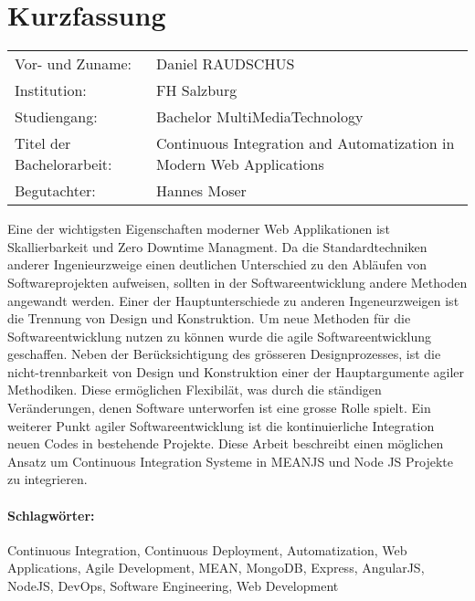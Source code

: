 \section*{Kurzfassung}
\begin{tabular}{l l}
Vor- und Zuname:& Daniel RAUDSCHUS\\
Institution: & FH Salzburg\\
Studiengang: &  Bachelor MultiMediaTechnology\\
Titel der Bachelorarbeit: & Continuous Integration and Automatization in Modern Web Applications\\
Begutachter: & Hannes Moser\\
\end{tabular}
\vspace{0.5cm}

Eine der wichtigsten Eigenschaften moderner Web Applikationen ist Skallierbarkeit und Zero Downtime Managment. Da die Standardtechniken anderer Ingenieurzweige
einen deutlichen Unterschied zu den Abläufen von Softwareprojekten aufweisen, sollten in der Softwareentwicklung andere Methoden angewandt werden. Einer der
Hauptunterschiede zu anderen Ingeneurzweigen ist die Trennung von Design und Konstruktion. Um neue Methoden für die Softwareentwicklung nutzen zu können
wurde die agile Softwareentwicklung geschaffen. Neben der Berücksichtigung des grösseren Designprozesses, ist die nicht-trennbarkeit von Design und Konstruktion
einer der Hauptargumente agiler Methodiken. Diese ermöglichen Flexibilät, was durch die ständigen Veränderungen, denen Software unterworfen ist eine grosse
Rolle spielt. Ein weiterer Punkt agiler Softwareentwicklung ist die kontinuierliche Integration neuen Codes in bestehende Projekte. Diese Arbeit
beschreibt einen möglichen Ansatz um Continuous Integration Systeme in MEANJS und Node JS Projekte zu integrieren.

\paragraph{Schlagwörter:}
Continuous Integration, Continuous Deployment, Automatization, Web Applications, Agile Development, MEAN, MongoDB, Express, AngularJS, NodeJS, DevOps, Software Engineering, Web Development
